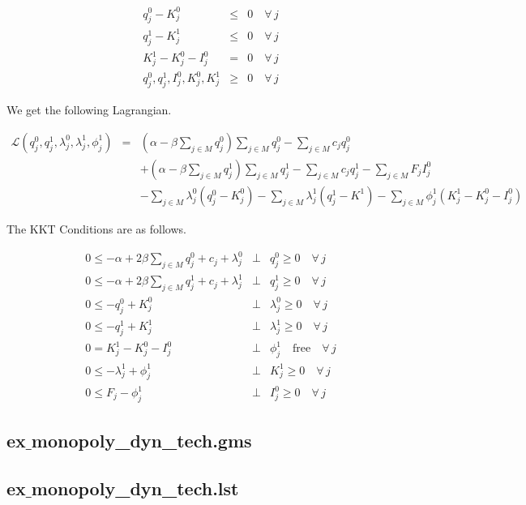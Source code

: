 \documentclass[11pt,a4paper]{article}
\begin{document}
\begin{eqnarray*}
	q_j^0 - K_j^0 &\leq& 0 \quad \forall\,j\\
	q_j^1 - K_j^1 &\leq& 0 \quad \forall\,j\\
        K_j^1 - K_j^0 - I_j^0 &=& 0 \quad \forall\,j\\
	q_j^0,q_j^1,I_j^0, K_j^0, K_j^1 &\geq& 0 \quad \forall\,j 
\end{eqnarray*}
 
We get the following Lagrangian.

\begin{eqnarray*}
	\mathcal{L}(q_j^0,q_j^1,\lambda_j^0,\lambda_j^1,\phi_j^1)&=& (\alpha-\beta \sum_{j\in M}q_j^0)\sum_{j\in M}q_j^0 - \sum_{j\in M}c_jq_j^0 \\
        && +  (\alpha-\beta \sum_{j\in M}q_j^1)\sum_{j\in M}q_j^1 - \sum_{j\in M}c_jq_j^1  - \sum_{j\in M}F_jI_j^0\\
        && - \sum_{j\in M}\lambda_j^0(q_j^0-K_j^0) - \sum_{j\in M}\lambda_j^1(q_j^1-K^1) - \sum_{j\in M}\phi_j^1(K_j^1-K_j^0-I_j^0)
\end{eqnarray*}

The KKT Conditions are as follows.

\begin{eqnarray*}
	0 \leq -\alpha + 2\beta \sum_{j\in M}q_j^0 + c_j + \lambda_j^0 &\bot& q_j^0 \geq 0\quad \forall\, j\\
	0 \leq -\alpha + 2\beta \sum_{j\in M}q_j^1 + c_j + \lambda_j^1 &\bot& q_j^1 \geq 0\quad \forall\, j\\
	0 \leq -q_j^0 + K_j^0 &\bot& \lambda_j^0 \geq 0 \quad \forall\, j \\
	0 \leq -q_j^1 + K_j^1 &\bot& \lambda_j^1 \geq 0 \quad \forall\, j \\
        0 = K_j^1 - K_j^0 - I_j^0 &\bot& \phi_j^1 \quad \mbox{free}  \quad \forall\, j\\
        0 \leq -\lambda_j^1 + \phi_j^1 &\bot& K_j^1 \geq 0  \quad \forall\, j\\
        0 \leq F_j - \phi_j^1 &\bot& I_j^0 \geq 0  \quad \forall\, j
\end{eqnarray*}


\subsection*{ex$\_$monopoly\_dyn\_tech.gms}



\subsection*{ex$\_$monopoly\_dyn\_tech.lst}
\end{document}
